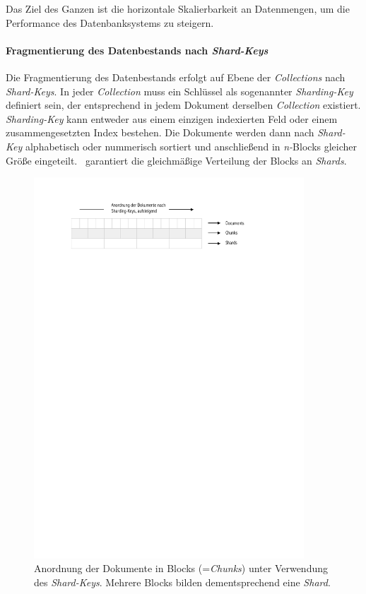 Das Ziel des Ganzen ist die horizontale Skalierbarkeit an Datenmengen, um die Performance des Datenbanksystems zu steigern.

\paragraph{Fragmentierung des Datenbestands nach \textit{Shard-Keys}}\label{sharding-keys}
Die Fragmentierung des Datenbestands erfolgt auf Ebene der \textit{Collections} nach \textit{Shard-Keys}. In jeder \textit{Collection}  muss ein Schlüssel als sogenannter \textit{Sharding-Key} definiert sein, der entsprechend in jedem Dokument derselben \textit{Collection} existiert.  \textit{Sharding-Key} kann entweder aus einem einzigen indexierten Feld oder einem zusammengesetzten Index bestehen. Die Dokumente werden dann nach \textit{Shard-Key} alphabetisch oder nummerisch sortiert und anschließend in \textit{n-}Blocks gleicher Größe eingeteilt. \mongo\ garantiert die gleichmäßige Verteilung der Blocks an \textit{Shards}.
\begin{figure}[H]
\centering
 \includegraphics[trim = 25mm 240mm 40mm 20mm, clip, width=0.9\textwidth]{resources/replicaSet/sharding-keys}
\caption[Anordnung der Dokumente in Blocks (=\textit{Chunks}) unter Verwendung des \textit{Shard-Keys}. Mehrere Blocks bilden dementsprechend eine \textit{Shard}.]{Anordnung der Dokumente in Blocks (=\textit{Chunks}) unter Verwendung des \textit{Shard-Keys}. Mehrere Blocks bilden dementsprechend eine \textit{Shard}.}
\label{img:shardKeys}
\end{figure}

